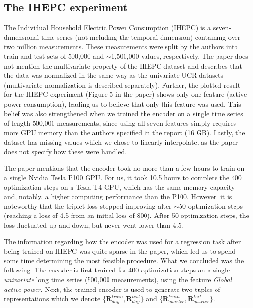 \subsection{The IHEPC experiment}
\label{ihepc}
The Individual Household Electric Power Consumption (IHEPC) is a seven-dimensional time series (not including the temporal dimension) containing over two million measurements. These measurements were split by the authors into train and test sets of 500,000 and $\sim$1,500,000 values, respectively. The paper does not mention the multivariate property of the IHEPC dataset and describes that the data was normalized in the same way as the univariate UCR datasets (multivariate normalization is described separately). Further, the plotted result for the IHEPC experiment (Figure 5 in the paper) shows only one feature (active power consumption), leading us to believe that only this feature was used. This belief was also strengthened when we trained the encoder on a single time series of length 500,000 measurements, since using all seven features simply requires more GPU memory than the authors specified in the report (16 GB). Lastly, the dataset has missing values which we chose to linearly interpolate, as the paper does not specify how these were handled.

The paper mentions that the encoder took no more than a few hours to train on a single Nvidia Tesla P100 GPU. For us, it took 10.5 hours to complete the 400 optimization steps on a Tesla T4 GPU, which has the same memory capacity and, notably, a higher computing performance than the P100. However, it is noteworthy that the triplet loss stopped improving after $\sim$50 optimization steps (reaching a loss of 4.5 from an initial loss of 800). After 50 optimization steps, the loss fluctuated up and down, but never went lower than 4.5.

The information regarding how the encoder was used for a regression task after being trained on IHEPC was quite sparse in the paper, which led us to spend some time determining the most feasible procedure. What we concluded was the following. 
The encoder is first trained for 400 optimization steps on a single \textit{univariate} long time series (500,000 measurements), using the feature  \textit{Global active power}. 
Next, the trained encoder is used to generate two tuples of representations which we denote $\{\mathbf{R}_{day}^{train},\mathbf{R}_{day}^{test}\}$ and $\{\mathbf{R}_{quarter}^{train},\mathbf{R}_{quarter}^{test}\}$.

